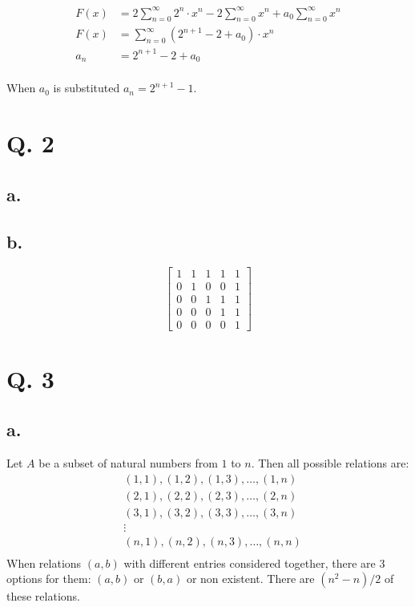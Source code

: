 \documentclass[12pt]{article}
\begin{document}
\begin{align*}
    F(x) &= 2\sum_{n=0}^{\infty} 2^n\cdot x^n - 2\sum_{n=0}^{\infty} x^n + a_0\sum_{n=0}^{\infty} x^n \\
    F(x) &= \sum_{n=0}^{\infty} (2^{n+1} - 2 + a_0)\cdot x^n \\
    a_n &= 2^{n+1} - 2 + a_0 \\
\end{align*}

When $a_0$ is substituted $a_n = 2^{n+1} - 1$.

\section*{Q. 2}
\subsection*{a.}
\begin{center}
\end{center}

\subsection*{b.}
\begin{equation*}
    \begin{bmatrix}
        1 & 1 & 1 & 1 & 1\\
        0 & 1 & 0 & 0 & 1\\
        0 & 0 & 1 & 1 & 1\\
        0 & 0 & 0 & 1 & 1\\
        0 & 0 & 0 & 0 & 1 
    \end{bmatrix}
\end{equation*}

\section*{Q. 3}
\subsection*{a.}
Let $A$ be a subset of natural numbers from $1$ to $n$. 
Then all possible relations are:
\begin{align*}
    &(1,1), (1,2), (1,3), \dots, (1,n) \\
    &(2,1), (2,2), (2,3), \dots, (2,n) \\
    &(3,1), (3,2), (3,3), \dots, (3,n) \\
    &\vdots \\
    &(n,1), (n,2),(n,3), \dots, (n,n) \\
\end{align*}
When relations $(a,b)$ with different entries considered together, there are $3$ options for them: $(a,b)$ or $(b,a)$ or non existent.
There are $(n^2-n) / 2$ of these relations.
\end{document}
